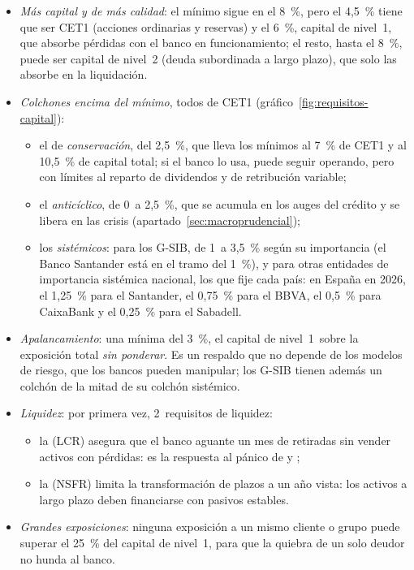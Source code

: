 \documentclass[11pt]{article}
\begin{document}
\begin{itemize}
\item \emph{Más capital y de más calidad}: el mínimo sigue en el 8~\%, pero el 4,5~\% tiene que ser CET1 (acciones ordinarias y reservas) y el 6~\%, capital de nivel~1, que absorbe pérdidas con el banco en funcionamiento; el resto, hasta el 8~\%, puede ser capital de nivel~2 (deuda subordinada a largo plazo), que solo las absorbe en la liquidación\nocite{BCBS2011Basilea3}.
\item \emph{Colchones encima del mínimo}, todos de CET1 (gráfico~\ref{fig:requisitos-capital}):
  \begin{itemize}
  \item el de \emph{conservación}, del 2,5~\%, que lleva los mínimos al 7~\% de CET1 y al 10,5~\% de capital total; si el banco lo usa, puede seguir operando, pero con límites al reparto de dividendos y de retribución variable;
  \item el \emph{anticíclico}, de 0~a 2,5~\%, que se acumula en los auges del crédito y se libera en las crisis (apartado~\ref{sec:macroprudencial});
  \item los \emph{sistémicos}: para los G-SIB, de 1~a 3,5~\% según su importancia (el Banco Santander está en el tramo del 1~\%), y para otras entidades de importancia sistémica nacional, los que fije cada país: en España en 2026, el 1,25~\% para el Santander, el 0,75~\% para el BBVA, el 0,5~\% para CaixaBank y el 0,25~\% para el Sabadell\nocite{FSB2025GSIB,BdE2025OEIS}.
  \end{itemize}
\item \emph{Apalancamiento}: una  mínima del 3~\%, el capital de nivel~1~sobre la exposición total \emph{sin ponderar}. Es un respaldo que no depende de los modelos de riesgo, que los bancos pueden manipular; los G-SIB tienen además un colchón de la mitad de su colchón sistémico.
\item \emph{Liquidez}: por primera vez, 2~requisitos de liquidez\nocite{BCBS2013LCR,BCBS2014NSFR}:
  \begin{itemize}
  \item la  (LCR) asegura que el banco aguante un mes de retiradas sin vender activos con pérdidas: es la respuesta al pánico de  y ;
  \item la  (NSFR) limita la transformación de plazos a un año vista: los activos a largo plazo deben financiarse con pasivos estables.
  \end{itemize}
\item \emph{Grandes exposiciones}: ninguna exposición a un mismo cliente o grupo puede superar el 25~\% del capital de nivel~1, para que la quiebra de un solo deudor no hunda al banco.
\end{itemize}
\end{document}
